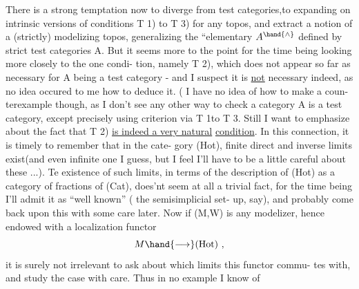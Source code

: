 There is a strong temptation now to diverge from test categories,\hand{\textbackslash}to
\margin{\unsure{--}}expanding on intrinsic versions of conditions  T 1) to T 3) for any topos,
and extract a notion of a (strictly) modelizing topos,  generalizing the
``elementary  $A^{\hand{\wedge}}$ defined by strict test categories A.  But it seems
more to the point for the time being looking more closely to the one condi-%
tion,  namely T 2),  which does not appear so far as necessary for A being
a test category  -  and I suspect it is \uline{not} necessary indeed,  as no idea
occured to me how to deduce it\hand{(}\hand{)}. ( I have no idea of how to make a coun-%
terexample though,  as I don't see any other way to check a category A is
a test category,  except precisely using  criterion via T 1\hand{)}to T 3\hand{)}.\hand{)}
Still I want to emphasize about the fact that T 2) \uline{is indeed a very natural}
\uline{condition}.  In this connection,  it is timely to remember that in the cate-%
gory (Hot),  finite direct and inverse limits exist(and even infinite one
I guess,  but I feel I'll have to be a little careful about these ...).
Te existence of such limits,  in terms of the description of (Hot) as a
category of fractions of (Cat),  does'nt seem at all a trivial fact,  for
the time being I'll admit it as  ``well known'' ( the semisimplicial set-%
up,  say),  and probably come back upon this with some care later.  Now if
 (M,W) is any modelizer,  hence endowed with a localization functor
\[ M \hand{\longrightarrow} (\mathrm{Hot}) \ , \]
it is surely not irrelevant to ask about which limits this functor commu-%
tes with,  and study the case with care.  Thus in no  example I know of
